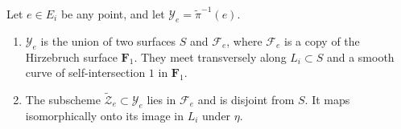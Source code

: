 \documentclass[reqno]{amsart}
\numberwithin{equation}{section}
\newcommand{\F}{\mathbf{F}}
\begin{document}
\begin{proposition}
  \label{prop:geometry}
  Let $e \in E_{i}$ be any point, and let
  $\mathcal{Y}_{e} = \widetilde{\pi}^{-1}(e)$.
  \begin{enumerate}
  \item $\mathcal{Y}_{e}$ is the union of two surfaces $S$ and $\mathcal{F}_e$, where $\mathcal{F}_e$ is a copy of the Hirzebruch surface $\F_1$.
    They meet transversely along $L_{i} \subset S$ and a smooth curve of self-intersection $1$ in $\F_1$.
  \item The subscheme $\widetilde{\mathcal{Z}}_e \subset \mathcal{Y}_e$ lies in $\mathcal{F}_e$ and is disjoint from $S$.
    It maps isomorphically onto its image in $L_{i}$ under $\eta$.
  \end{enumerate}
\end{proposition}
\end{document}
